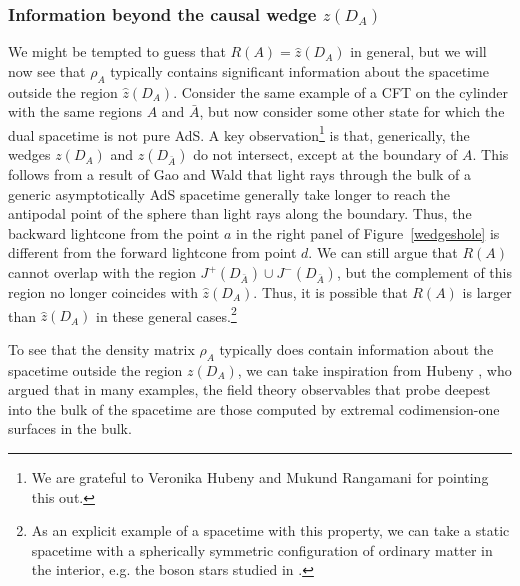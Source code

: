 \documentclass[12pt]{article}
\renewcommand{\(}{\left(}
\renewcommand{\)}{\right)}
\begin{document}
\subsubsection*{Information beyond the causal wedge $z(D_A)$}

We might be tempted to guess that $R(A)=\hat{z}(D_A)$ in general, but we will now see that $\rho_A$ typically contains significant information about the spacetime outside the region $\hat{z}(D_A)$.
Consider the same example of a CFT on the cylinder with the same regions $A$ and $\bar{A}$, but now consider some other state for which the dual spacetime is not pure AdS. A key observation\footnote{We are grateful to Veronika Hubeny and Mukund Rangamani for pointing this out.} is that, generically, the wedges $z(D_A)$ and $z(D_{\bar{A}})$ do not intersect, except at the boundary of $A$. This follows from a result of Gao and Wald \cite{Gao:2000ga} that light rays through the bulk of a generic asymptotically AdS spacetime generally take longer to reach the antipodal point of the sphere than light rays along the boundary. Thus, the backward lightcone from the point $a$ in the right panel of Figure~\ref{wedgeshole} is different from the forward lightcone from point $d$. We can still argue that $R(A)$ cannot overlap with the region
$J^+(D_{\bar A}) \cup J^-(D_{\bar A })$, but the complement of this region no longer coincides with $\hat z(D_A)$. Thus, it is possible that $R(A)$ is larger than $\hat z(D_A)$ in these general cases.\footnote{As an explicit example of a spacetime with this property, we can take a static spacetime with a spherically symmetric configuration of ordinary matter in the interior, e.g. the boson stars studied in \cite{Astefanesei:2003qy}.}


To see that the density matrix $\rho_A$ typically does contain information about the spacetime outside the region $z(D_A)$, we can take inspiration from Hubeny \cite{Hubeny:2012ry}, who argued that in many examples, the field theory observables that probe deepest into the bulk of the spacetime are those computed by extremal codimension-one surfaces in the bulk.
\end{document}
